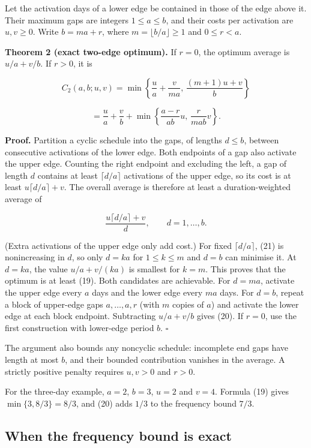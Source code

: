 \documentclass[
  british,
  11pt,
  a4paper,
]{article}
\begin{document}
Let the activation days of a lower edge be contained in those of the
edge above it. Their maximum gaps are integers \(1\le a\le b\), and
their costs per activation are \(u,v\ge0\). Write \(b=ma+r\), where
\(m=\lfloor b/a\rfloor\ge1\) and \(0\le r<a\).

\textbf{Theorem 2 (exact two-edge optimum).} If \(r=0\), the optimum
average is \(u/a+v/b\). If \(r>0\), it is

\[
C_2(a,b;u,v)=
\min\left\{\frac ua+\frac v{ma},\,
\frac{(m+1)u+v}{b}\right\} \tag{19}
\]

\[
=\frac ua+\frac vb+
\min\left\{\frac{a-r}{ab}u,\,
\frac r{mab}v\right\}. \tag{20}
\]

\textbf{Proof.} Partition a cyclic schedule into the gaps, of lengths
\(d\le b\), between consecutive activations of the lower edge. Both
endpoints of a gap also activate the upper edge. Counting the right
endpoint and excluding the left, a gap of length \(d\) contains at least
\(\lceil d/a\rceil\) activations of the upper edge, so its cost is at
least \(u\lceil d/a\rceil+v\). The overall average is therefore at least
a duration-weighted average of

\[
\frac{u\lceil d/a\rceil+v}{d},\qquad d=1,\ldots,b. \tag{21}
\]

(Extra activations of the upper edge only add cost.) For fixed
\(\lceil d/a\rceil\), (21) is nonincreasing in \(d\), so only \(d=ka\)
for \(1\le k\le m\) and \(d=b\) can minimise it. At \(d=ka\), the value
\(u/a+v/(ka)\) is smallest for \(k=m\). This proves that the optimum is
at least (19). Both candidates are achievable. For \(d=ma\), activate
the upper edge every \(a\) days and the lower edge every \(ma\) days.
For \(d=b\), repeat a block of upper-edge gaps \(a,\ldots,a,r\) (with
\(m\) copies of \(a\)) and activate the lower edge at each block
endpoint. Subtracting \(u/a+v/b\) gives (20). If \(r=0\), use the first
construction with lower-edge period \(b\). \(\square\)

The argument also bounds any noncyclic schedule: incomplete end gaps
have length at most \(b\), and their bounded contribution vanishes in
the average. A strictly positive penalty requires \(u,v>0\) and \(r>0\).

For the three-day example, \(a=2\), \(b=3\), \(u=2\) and \(v=4\).
Formula (19) gives \(\min\{3,8/3\}=8/3\), and (20) adds \(1/3\) to the
frequency bound \(7/3\).

\subsection{When the frequency bound is
exact}\label{when-the-frequency-bound-is-exact}
\end{document}
